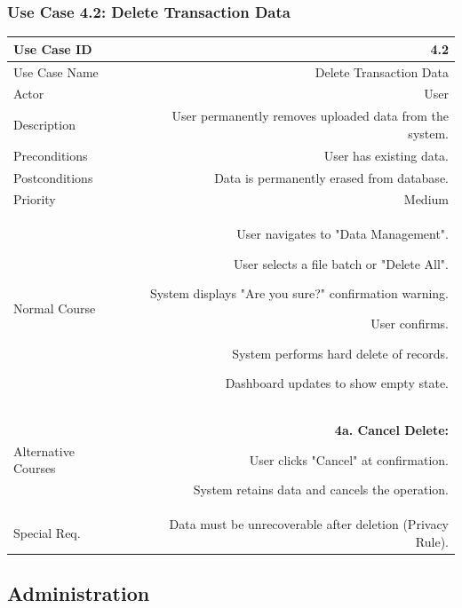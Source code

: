 \documentclass[11pt,a4paper]{report}
\begin{document}
\subsubsection{Use Case 4.2: Delete Transaction Data}
\begin{tabularx}{\textwidth}{|L|R|}
	\hline
	Use Case ID & 4.2 \\ \hline
	Use Case Name & Delete Transaction Data \\ \hline
	Actor & User \\ \hline
	Description & User permanently removes uploaded data from the system. \\ \hline
	Preconditions & User has existing data. \\ \hline
	Postconditions & Data is permanently erased from database. \\ \hline
	Priority & Medium \\ \hline
	Normal Course & 
	\begin{normalsteps}
		\item User navigates to "Data Management".
		\item User selects a file batch or "Delete All".
		\item System displays "Are you sure?" confirmation warning.
		\item User confirms.
		\item System performs hard delete of records.
		\item Dashboard updates to show empty state.
	\end{normalsteps} \\ \hline
	Alternative Courses & 
	\textbf{4a. Cancel Delete:} 
	\begin{altsteps}
		\item User clicks "Cancel" at confirmation.
		\item System retains data and cancels the operation.
	\end{altsteps} \\ \hline
	Special Req. & Data must be unrecoverable after deletion (Privacy Rule). \\ \hline
\end{tabularx}

\newpage

\subsection{Administration}

\end{document}
